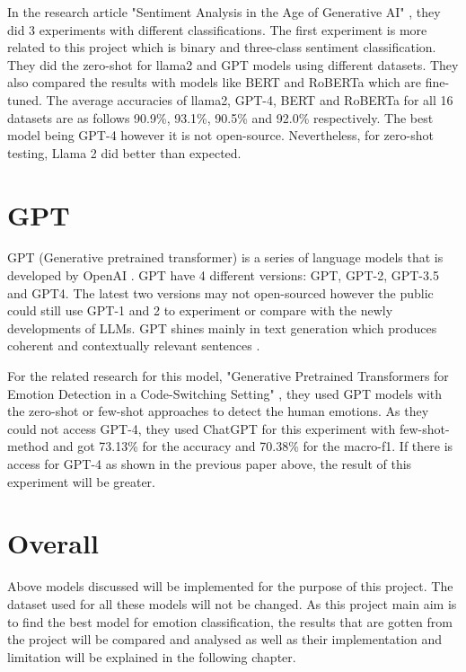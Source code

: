 In the research article "Sentiment Analysis in the Age of Generative AI" \cite{Krugmann_Hartmann_2024}, they did 3 experiments with different classifications. The first experiment is more related to this project which is binary and three-class sentiment classification. They did the zero-shot for llama2 and GPT models using different datasets. They also compared the results with models like BERT and RoBERTa which are fine-tuned. The average accuracies of llama2, GPT-4, BERT and RoBERTa for all 16 datasets are as follows 90.9\%, 93.1\%, 90.5\% and 92.0\% respectively. The best model being GPT-4 however it is not open-source. Nevertheless, for zero-shot testing, Llama 2 did better than expected.

\section{GPT}
 GPT (Generative pretrained transformer) is a series of language models that is developed by OpenAI \cite{Jorge_2023}. GPT have 4 different versions: GPT, GPT-2, GPT-3.5 and GPT4. The latest two versions may not open-sourced however the public could still use GPT-1 and 2 to experiment or compare with the newly developments of LLMs. GPT shines mainly in text generation which produces coherent and contextually relevant sentences \cite{Jorge_2023}.
 
 For the related research for this model, "Generative Pretrained Transformers for Emotion Detection in a Code-Switching Setting" \cite{Nedilko}, they used GPT models with the zero-shot or few-shot approaches to detect the human emotions. As they could not access GPT-4, they used ChatGPT for this experiment with few-shot-method and got 73.13\% for the accuracy and 70.38\% for the macro-f1. If there is access for GPT-4 as shown in the previous paper above, the result of this experiment will be greater.
 
 \section{Overall}

 Above models discussed will be implemented for the purpose of this project. The dataset used for all these models will not be changed. As this project main aim is to find the best model for emotion classification, the results that are gotten from the project will be compared and analysed as well as their implementation and limitation will be explained in the following chapter.